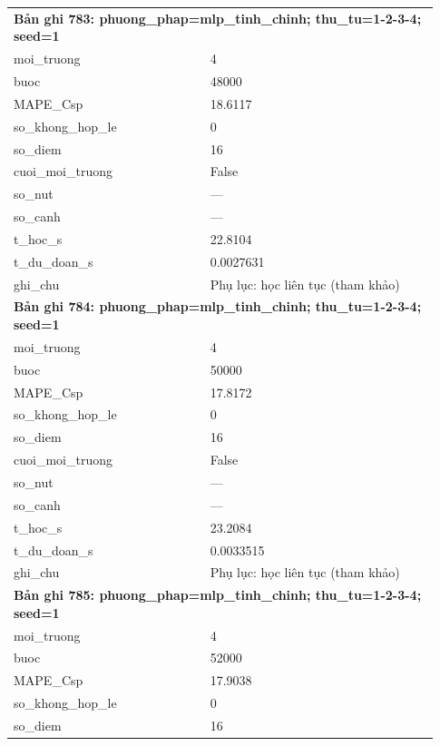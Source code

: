 \begin{longtable}{p{0.43\linewidth}p{0.50\linewidth}}
\midrule
\multicolumn{2}{p{0.95\linewidth}}{\textbf{Bản ghi 783: phuong\_phap=mlp\_tinh\_chinh; thu\_tu=1-2-3-4; seed=1}} \\
moi\_\allowbreak truong & 4 \\
buoc & 48000 \\
MAPE\_\allowbreak Csp & 18.6117 \\
so\_\allowbreak khong\_\allowbreak hop\_\allowbreak le & 0 \\
so\_\allowbreak diem & 16 \\
cuoi\_\allowbreak moi\_\allowbreak truong & False \\
so\_\allowbreak nut & — \\
so\_\allowbreak canh & — \\
t\_\allowbreak hoc\_\allowbreak s & 22.8104 \\
t\_\allowbreak du\_\allowbreak doan\_\allowbreak s & 0.0027631 \\
ghi\_\allowbreak chu & Phụ lục: học liên tục (tham khảo) \\
\midrule
\multicolumn{2}{p{0.95\linewidth}}{\textbf{Bản ghi 784: phuong\_phap=mlp\_tinh\_chinh; thu\_tu=1-2-3-4; seed=1}} \\
moi\_\allowbreak truong & 4 \\
buoc & 50000 \\
MAPE\_\allowbreak Csp & 17.8172 \\
so\_\allowbreak khong\_\allowbreak hop\_\allowbreak le & 0 \\
so\_\allowbreak diem & 16 \\
cuoi\_\allowbreak moi\_\allowbreak truong & False \\
so\_\allowbreak nut & — \\
so\_\allowbreak canh & — \\
t\_\allowbreak hoc\_\allowbreak s & 23.2084 \\
t\_\allowbreak du\_\allowbreak doan\_\allowbreak s & 0.0033515 \\
ghi\_\allowbreak chu & Phụ lục: học liên tục (tham khảo) \\
\midrule
\multicolumn{2}{p{0.95\linewidth}}{\textbf{Bản ghi 785: phuong\_phap=mlp\_tinh\_chinh; thu\_tu=1-2-3-4; seed=1}} \\
moi\_\allowbreak truong & 4 \\
buoc & 52000 \\
MAPE\_\allowbreak Csp & 17.9038 \\
so\_\allowbreak khong\_\allowbreak hop\_\allowbreak le & 0 \\
so\_\allowbreak diem & 16 \\

\end{longtable}
